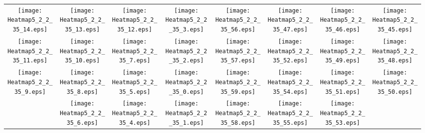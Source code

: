 \documentclass{standalone}
\begin{document}
\begin{tabular}{ *8{c} }
\texttt{[image: Heatmap5\_2\_2\_35\_14.eps]} & \texttt{[image: Heatmap5\_2\_2\_35\_13.eps]} & \texttt{[image: Heatmap5\_2\_2\_35\_12.eps]} & \texttt{[image: Heatmap5\_2\_2\_35\_3.eps]} & \texttt{[image: Heatmap5\_2\_2\_35\_56.eps]} & \texttt{[image: Heatmap5\_2\_2\_35\_47.eps]} & \texttt{[image: Heatmap5\_2\_2\_35\_46.eps]} & \texttt{[image: Heatmap5\_2\_2\_35\_45.eps]} \\
\texttt{[image: Heatmap5\_2\_2\_35\_11.eps]} & \texttt{[image: Heatmap5\_2\_2\_35\_10.eps]} & \texttt{[image: Heatmap5\_2\_2\_35\_7.eps]} & \texttt{[image: Heatmap5\_2\_2\_35\_2.eps]} & \texttt{[image: Heatmap5\_2\_2\_35\_57.eps]} & \texttt{[image: Heatmap5\_2\_2\_35\_52.eps]} & \texttt{[image: Heatmap5\_2\_2\_35\_49.eps]} & \texttt{[image: Heatmap5\_2\_2\_35\_48.eps]} \\
\texttt{[image: Heatmap5\_2\_2\_35\_9.eps]} & \texttt{[image: Heatmap5\_2\_2\_35\_8.eps]} & \texttt{[image: Heatmap5\_2\_2\_35\_5.eps]} & \texttt{[image: Heatmap5\_2\_2\_35\_0.eps]} & \texttt{[image: Heatmap5\_2\_2\_35\_59.eps]} & \texttt{[image: Heatmap5\_2\_2\_35\_54.eps]} & \texttt{[image: Heatmap5\_2\_2\_35\_51.eps]} & \texttt{[image: Heatmap5\_2\_2\_35\_50.eps]} \\
 & \texttt{[image: Heatmap5\_2\_2\_35\_6.eps]} & \texttt{[image: Heatmap5\_2\_2\_35\_4.eps]} & \texttt{[image: Heatmap5\_2\_2\_35\_1.eps]} & \texttt{[image: Heatmap5\_2\_2\_35\_58.eps]} & \texttt{[image: Heatmap5\_2\_2\_35\_55.eps]} & \texttt{[image: Heatmap5\_2\_2\_35\_53.eps]} &  
\end{tabular}
\end{document}
